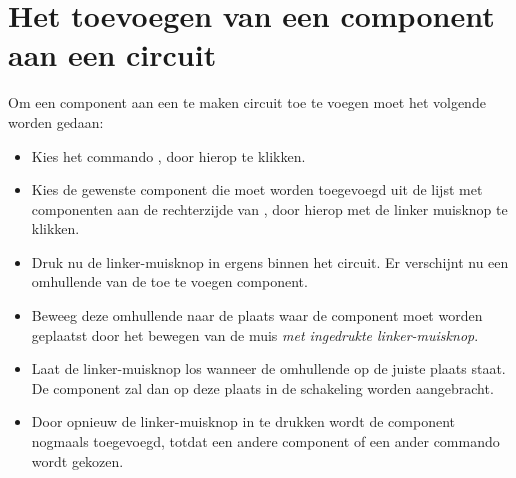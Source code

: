 \section{Het toevoegen van een component aan een circuit}
Om een component aan een te maken circuit toe te voegen moet het volgende
worden gedaan:
\begin{itemize}
\item Kies het commando , door hierop te klikken.
\item Kies de gewenste component die moet worden toegevoegd uit de lijst
      met componenten aan de rechterzijde van , door hierop met de
      linker muisknop te klikken.
\item Druk nu de linker-muisknop in ergens binnen het circuit. Er verschijnt
      nu een omhullende van de toe te voegen component.
\item Beweeg deze omhullende naar de plaats waar de component moet worden
      geplaatst door het bewegen van de muis {\it met ingedrukte linker-muisknop}.
\item Laat de linker-muisknop los wanneer de omhullende op de juiste plaats staat.
	De component zal dan op deze plaats in de schakeling worden aangebracht.
\item Door opnieuw de linker-muisknop in te drukken wordt de component
      nogmaals toegevoegd, totdat een andere component of een ander
      commando wordt gekozen.
\end{itemize}

